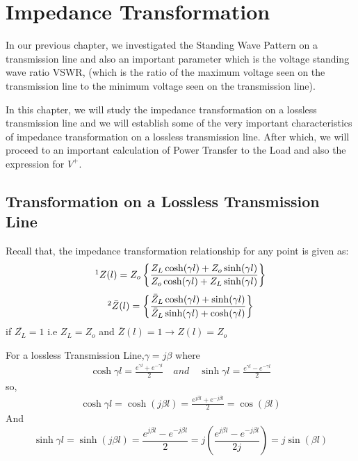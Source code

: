\chapter{Impedance Transformation}\label{lec:lec6}
In our previous chapter, we investigated the Standing Wave Pattern on a transmission line and also an important parameter which is the voltage standing wave ratio VSWR, (which is the ratio of the maximum voltage seen on the transmission line to the minimum voltage seen on the transmission line).

In this chapter, we will study the impedance transformation on a lossless
transmission line and we will establish some of the very important characteristics of impedance transformation on a lossless transmission line. After which, we will proceed to an important calculation of Power Transfer to the Load and also the expression for $V^{+}$.
\section{Transformation on a Lossless Transmission Line}
Recall that, the impedance transformation relationship for any point is given as:
\begin{align*}
\footnotemark[1]Z(l) = Z_o\left\lbrace \frac{Z_L\cosh(\gamma l) + Z_o\sinh(\gamma l)}{Z_o\cosh(\gamma l) + Z_L\sinh(\gamma l)}\right\rbrace 
\end{align*}
\begin{align*}
\footnotemark[2]\bar{Z}(l) = \left\lbrace \frac{\bar{Z}_L\cosh(\gamma l) + \sinh(\gamma l)}{\bar{Z}_L\sinh(\gamma l) + \cosh(\gamma l)}\right\rbrace 
\end{align*}
if $\bar{Z_L} = 1$ i.e $Z_L = Z_o$ and $\bar{Z}(l) = 1 \rightarrow  Z(l) = Z_o$

For a lossless Transmission Line,$\gamma=j\beta$ where
\begin{align*}
\cosh\gamma l = \frac{e^{\gamma l} + e^{-\gamma l}}{2} \quad and \quad \sinh\gamma l = \frac{e^{\gamma l} - e^{-\gamma l}}{2}
\end{align*}
so,
\begin{align*}
\cosh\gamma l= \cosh(j\beta l)=\frac{e^{j \beta l} + e^{-j \beta l}}{2}=\cos(\beta l)
\end{align*}
And
\begin{dmath*}
\sinh\gamma l=\sinh(j\beta l) = \frac{e^{j \beta l}-e^{-j\beta l}}{2} = j\left( \frac{e^{j\beta l}-e^{-j\beta l}}{2j}\right) =j\sin(\beta l)
\end{dmath*}

